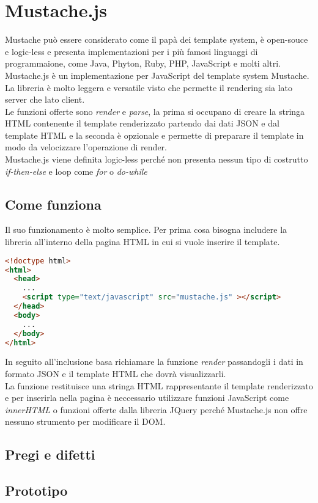 \section{Mustache.js}
Mustache può essere considerato come il papà dei template system, è open-souce e logic-less e presenta implementazioni per i più famosi linguaggi di programmaione, come Java, Phyton, Ruby, PHP, JavaScript e molti altri.\\
Mustache.js è un implementazione per JavaScript del template system Mustache.\\
La libreria è molto leggera e versatile visto che permette il rendering sia lato server che lato client.\\
Le funzioni offerte sono \textit{render} e \textit{parse}, la prima si occupano di creare la stringa HTML contenente il template renderizzato partendo dai dati JSON e dal template HTML e la seconda è opzionale e permette di preparare il template in modo da velocizzare l'operazione di render.\\
Mustache.js viene definita logic-less perché non presenta nessun tipo di costrutto \textit{if-then-else} e loop come \textit{for} o \textit{do-while}
\subsection{Come funziona}
Il suo funzionamento è molto semplice.
Per prima cosa bisogna includere la libreria all'interno della pagina HTML in cui si vuole inserire il template.
\begin{lstlisting}[language=HTML, caption=Inclusione libreria Mustache.js nel file HTML.]
<!doctype html>
<html>
  <head>
    ...
    <script type="text/javascript" src="mustache.js" ></script>
  </head>
  <body>
    ...
  </body>
</html>
\end{lstlisting}
In seguito all'inclusione basa richiamare la funzione \textit{render} passandogli i dati in formato JSON e il template HTML che dovrà visualizzarli.\\
La funzione restituisce una stringa HTML rappresentante il template renderizzato e per inserirla nella pagina è neccessario utilizzare funzioni JavaScript come \textit{innerHTML} o funzioni offerte dalla libreria JQuery perché Mustache.js non offre nessuno strumento per modificare il DOM.
\subsection{Pregi e difetti}

\subsection{Prototipo}


